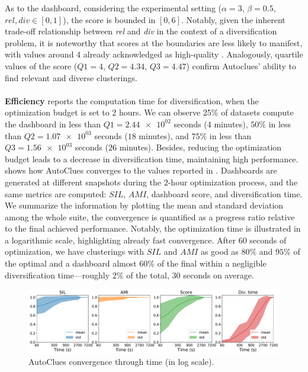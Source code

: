 \documentclass[runningheads]{llncs}
\begin{document}
As to the dashboard, considering the experimental setting ($\alpha=3$, $\beta=0.5$,  $rel, div \in [0, 1]$), the score is bounded in $[0, 6]$.
Notably, given the inherent trade-off relationship between \textit{rel} and \textit{div} in the context of a diversification problem, it is noteworthy that scores at the boundaries are less likely to manifest,
with values around $4$ already acknowledged as high-quality \cite{vieira2011query}.
Analogously, quartile values of the score ($Q1=4$, $Q2=4.34$, $Q3=4.47$) confirm Autoclues' ability to find relevant and diverse clusterings.
\\
\\
\textbf{Efficiency}
 reports the computation time for diversification, when the optimization budget is set to 2 hours.
We can observe 25\% of datasets compute the dashboard in less than $Q1=\num{2.44e02}$ seconds ($4$ minutes), $50\%$ in less than $Q2=\num{1.07e03}$ seconds ($18$ minutes), and $75\%$ in less than $Q3=\num{1.56e03}$ seconds ($26$ minutes).
Besides, reducing the optimization budget leads to a decrease in diversification time, maintaining high performance.
%
 shows how AutoClues converges to the values reported in .
Dashboards are generated at different snapshots during the $2$-hour optimization process, and the same metrics are computed: $SIL$, $AMI$, dashboard score, and diversification time.
We summarize the information by plotting the mean and standard deviation among the whole suite, the convergence is quantified as a progress ratio relative to the final achieved performance.
Notably, the optimization time is illustrated in a logarithmic scale, highlighting already fast convergence.
After $60$ seconds of optimization, we have clusterings with $SIL$ and $AMI$ as good as $80\%$ and $95\%$ of the optimal and a dashboard almost $60\%$ of the final within a negligible diversification time---roughly $2\%$ of the total, $30$ seconds on average.

\begin{figure}[t]
    \centering
    \includegraphics[scale=.3]{img/all.pdf}
    \caption{AutoClues convergence through time (in log scale).}
    \label{fig:convergence}
\end{figure}
\end{document}
